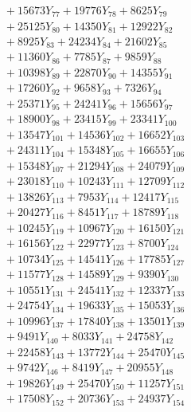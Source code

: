 \documentclass[a4paper,10pt]{article}
\begin{document}
{\begin{align}
&\;  + 15673 Y_{77} + 19776 Y_{78} + 8625 Y_{79} \\[0.3ex]
&\;  + 25125 Y_{80} + 14350 Y_{81} + 12922 Y_{82} \\[0.3ex]
&\;  + 8925 Y_{83} + 24234 Y_{84} + 21602 Y_{85} \\[0.3ex]
&\;  + 11360 Y_{86} + 7785 Y_{87} + 9859 Y_{88} \\[0.5ex]\allowbreak
&\;  + 10398 Y_{89} + 22870 Y_{90} + 14355 Y_{91} \\[0.3ex]
&\;  + 17260 Y_{92} + 9658 Y_{93} + 7326 Y_{94} \\[0.3ex]
&\;  + 25371 Y_{95} + 24241 Y_{96} + 15656 Y_{97} \\[0.3ex]
&\;  + 18900 Y_{98} + 23415 Y_{99} + 23341 Y_{100} \\[0.3ex]
&\;  + 13547 Y_{101} + 14536 Y_{102} + 16652 Y_{103} \\[0.3ex]
&\;  + 24311 Y_{104} + 15348 Y_{105} + 16655 Y_{106} \\[0.3ex]
&\;  + 15348 Y_{107} + 21294 Y_{108} + 24079 Y_{109} \\[0.3ex]
&\;  + 23018 Y_{110} + 10243 Y_{111} + 12709 Y_{112} \\[0.3ex]
&\;  + 13826 Y_{113} + 7953 Y_{114} + 12417 Y_{115} \\[0.3ex]
&\;  + 20427 Y_{116} + 8451 Y_{117} + 18789 Y_{118} \\[0.5ex]\allowbreak
&\;  + 10245 Y_{119} + 10967 Y_{120} + 16150 Y_{121} \\[0.3ex]
&\;  + 16156 Y_{122} + 22977 Y_{123} + 8700 Y_{124} \\[0.3ex]
&\;  + 10734 Y_{125} + 14541 Y_{126} + 17785 Y_{127} \\[0.3ex]
&\;  + 11577 Y_{128} + 14589 Y_{129} + 9390 Y_{130} \\[0.3ex]
&\;  + 10551 Y_{131} + 24541 Y_{132} + 12337 Y_{133} \\[0.3ex]
&\;  + 24754 Y_{134} + 19633 Y_{135} + 15053 Y_{136} \\[0.3ex]
&\;  + 10996 Y_{137} + 17840 Y_{138} + 13501 Y_{139} \\[0.3ex]
&\;  + 9491 Y_{140} + 8033 Y_{141} + 24758 Y_{142} \\[0.3ex]
&\;  + 22458 Y_{143} + 13772 Y_{144} + 25470 Y_{145} \\[0.3ex]
&\;  + 9742 Y_{146} + 8419 Y_{147} + 20955 Y_{148} \\[0.5ex]\allowbreak
&\;  + 19826 Y_{149} + 25470 Y_{150} + 11257 Y_{151} \\[0.3ex]
&\;  + 17508 Y_{152} + 20736 Y_{153} + 24937 Y_{154} \\[0.3ex]

\end{align}}
\end{document}
